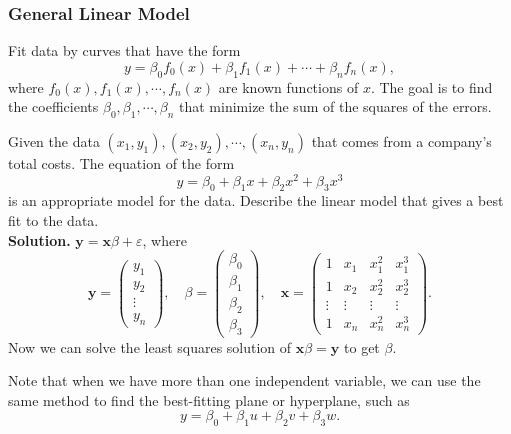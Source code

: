 \documentclass[10pt, a4paper]{article}
\newcommand{\vt}[1]{\mathbf{#1}}
\begin{document}
\subsubsection*{General Linear Model}
\indent Fit data by curves that have the form\[
y = \beta_0 f_0(x) + \beta_1 f_1(x) + \cdots + \beta_n f_n(x),
\]
where $f_0(x), f_1(x), \cdots, f_n(x)$ are known functions of $x$. The goal is to find the coefficients $\beta_0, \beta_1, \cdots, \beta_n$ that minimize the sum of the squares of the errors.
\begin{example}
    Given the data $(x_1,y_1), (x_2,y_2), \cdots, (x_n,y_n)$ that comes from a company's total costs. The equation of the form \[
    y = \beta_0 + \beta_1x + \beta_2x^2 + \beta_3x^3
    \]
    is an appropriate model for the data. Describe the linear model that gives a best fit to the data.\\
    \textbf{Solution.} $\vt{y}=\vt{x}\beta+\varepsilon$, where\[
    \vt{y}=\begin{pmatrix}
        y_1\\y_2\\\vdots\\y_n
    \end{pmatrix}, \quad \beta=\begin{pmatrix}
        \beta_0\\\beta_1\\\beta_2\\\beta_3
    \end{pmatrix}, \quad \vt{x}=\begin{pmatrix}
        1&x_1&x_1^2&x_1^3\\1&x_2&x_2^2&x_2^3\\\vdots&\vdots&\vdots&\vdots\\1&x_n&x_n^2&x_n^3
    \end{pmatrix}.
    \]
    Now we can solve the least squares solution of $\vt{x}\beta=\vt{y}$ to get $\beta$.
\end{example}
\indent Note that when we have more than one independent variable, we can use the same method to find the best-fitting plane or hyperplane, such as \[
y=\beta_0+\beta_1 u + \beta_2 v + \beta_3 w.
\]
\end{document}

